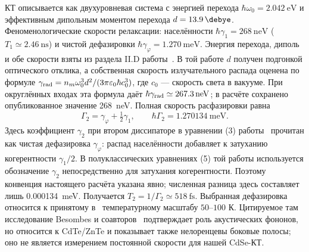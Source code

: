 КТ описывается как двухуровневая система с энергией перехода
$\hbar\omega_0=\SI{2.042}{\electronvolt}$ и эффективным дипольным моментом
перехода $d=\SI{13.9}{\debye}$. Феноменологические скорости релаксации:
населённости $\hbar\gamma_1=\SI{268}{\nano\electronvolt}$
($T_1\simeq\SI{2.46}{\nano\second}$) и чистой дефазировки
$\hbar\gamma_\varphi=\SI{1.270}{\milli\electronvolt}$.
Энергия перехода, диполь и обе скорости взяты из раздела II.D
работы~\cite{shah2013}. В той работе $d$ получен подгонкой оптического
отклика, а собственная скорость излучательного распада оценена по формуле
$\gamma_{\rm rad}=n_m\omega_0^3d^2/(3\pi\varepsilon_0\hbar c_0^3)$,
где $c_0$ --- скорость света в вакууме. При округлённых входах эта формула
даёт $\hbar\gamma_{\rm rad}\simeq\SI{267.3}{\nano\electronvolt}$;
в расчёте сохранено опубликованное значение \SI{268}{\nano\electronvolt}.
Полная скорость расфазировки равна
\begin{equation}
  \Gamma_2 = \gamma_\varphi + \tfrac{1}{2}\gamma_1,
  \qquad
  \hbar\Gamma_2 = \SI{1.270134}{\milli\electronvolt}.
  \label{eq:gamma2}
\end{equation}
Здесь коэффициент $\gamma_2$ при втором диссипаторе в уравнении (3)
работы~\cite{shah2013} прочитан как чистая дефазировка $\gamma_\varphi$:
распад населённости добавляет к затуханию когерентности $\gamma_1/2$.
В полуклассических уравнениях (5) той работы используется обозначение
$\gamma_2$ непосредственно для затухания когерентности. Поэтому конвенция
настоящего расчёта указана явно; численная разница здесь составляет
лишь \SI{0.000134}{\milli\electronvolt}. Получается
$T_2=1/\Gamma_2\simeq\SI{518}{\femto\second}$.
Выбранная дефазировка относится к принятому в~\cite{shah2013}
температурному масштабу $50$--$100$ К. Цитируемое там исследование
Besombes и соавторов~\cite{besombes2001} подтверждает роль акустических
фононов, но относится к CdTe/ZnTe и показывает также нелоренцевы боковые
полосы; оно не является измерением постоянной скорости для нашей CdSe-КТ.

